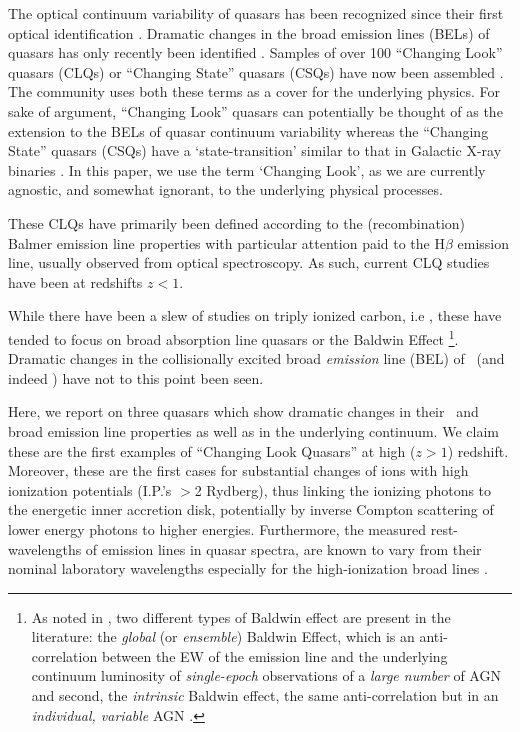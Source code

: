 \documentclass[a4paper,fleqn,usenatbib]{mnras}
\begin{document}
The optical continuum variability of quasars has been recognized since
their first optical identification
\citep[e.g.,][]{MatthewsSandage1963, MacLeod2012}.  Dramatic
changes in the broad emission lines (BELs) of quasars has only
recently been identified \citep[e.g., ][]{LaMassa2015}.  Samples of over
100 ``Changing Look'' quasars (CLQs) or ``Changing State'' quasars
(CSQs) have now been assembled \citep[e.g.][]{MacLeod2019,Graham2019}.
The community uses both these terms as a cover for the underlying
physics. For sake of argument, ``Changing Look'' quasars can
potentially be thought of as the extension to the BELs of quasar
continuum variability \citep[e.g., ][]{MacLeod2012} whereas the
``Changing State'' quasars (CSQs) have a `state-transition' similar to
that in Galactic X-ray binaries \citep[][]{NodaDone2018,
Ruan2019}. In this paper, we use the term `Changing Look', as we are
currently agnostic, and somewhat ignorant, to the underlying physical
processes.

These CLQs have primarily been defined according to the
(recombination) Balmer emission line properties with particular
attention paid to the H$\beta$ emission line, usually observed from
optical spectroscopy.  As such, current CLQ studies have been at
redshifts $z<1$.

While there have been a slew of studies on triply ionized carbon, i.e
\civ, these have tended to focus on broad absorption line quasars
\citep[BAL QSOs; see Table 1][]{Hemler2019} or the Baldwin Effect
\citep[BEff; ][]{Baldwin1977, Bian2012, Jensen2016,
Hamann2017}\footnote{As noted in \citet{Rakic2017}, two different
types of Baldwin effect are present in the literature: the {\it
global} (or {\it ensemble}) Baldwin Effect, which is an
anti-correlation between the EW of the emission line and the
underlying continuum luminosity of {\it single-epoch} observations of
a {\it large number} of AGN and second, the {\it intrinsic} Baldwin
effect, the same anti-correlation but in an {\it individual, variable}
AGN \citep{PoggePeterson1992}.}.  Dramatic changes in the
collisionally excited broad {\it emission} line (BEL) of \civ\ (and
indeed \ciii) have not to this point been seen.

Here, we report on three quasars  
which show dramatic changes in their \civ\ and \ciii broad emission
line properties as well as in the underlying continuum. We claim these
are the first examples of ``Changing Look Quasars'' at high ($z>1$)
redshift. Moreover, these are the first cases for substantial changes
of ions with high ionization potentials (I.P.'s $>$2 Rydberg), thus
linking the ionizing photons to the energetic inner accretion disk,
potentially by inverse Compton scattering of lower energy photons to
higher energies.  Furthermore, the measured rest-wavelengths of
emission lines in quasar spectra, are known to vary from their nominal
laboratory wavelengths especially for the high-ionization broad lines \citep[e.g.][]{VandenBerk2001}.
\end{document}
